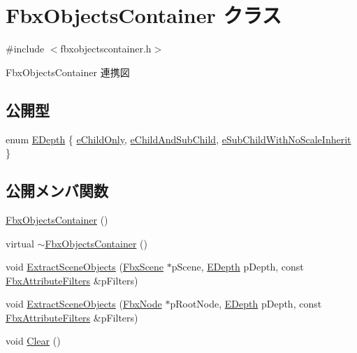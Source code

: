 \hypertarget{class_fbx_objects_container}{}\section{Fbx\+Objects\+Container クラス}
\label{class_fbx_objects_container}


{\ttfamily \#include $<$fbxobjectscontainer.\+h$>$}



Fbx\+Objects\+Container 連携図
\subsection*{公開型}
\begin{DoxyCompactItemize}
\item 
enum \hyperlink{class_fbx_objects_container_a70f47fef529be83cb1b45c0e067d73e5}{E\+Depth} \{ \hyperlink{class_fbx_objects_container_a70f47fef529be83cb1b45c0e067d73e5a8f0f79eb5473a347f5438586ef1d6874}{e\+Child\+Only}, 
\hyperlink{class_fbx_objects_container_a70f47fef529be83cb1b45c0e067d73e5a21904d2f9ea16c484da380962349eb83}{e\+Child\+And\+Sub\+Child}, 
\hyperlink{class_fbx_objects_container_a70f47fef529be83cb1b45c0e067d73e5a14f4e784039822e94a23b24d3f4c9bd5}{e\+Sub\+Child\+With\+No\+Scale\+Inherit}
 \}
\end{DoxyCompactItemize}
\subsection*{公開メンバ関数}
\begin{DoxyCompactItemize}
\item 
\hyperlink{class_fbx_objects_container_a48d3e8b9458cd4ec7ba67c02b537f353}{Fbx\+Objects\+Container} ()
\item 
virtual \hyperlink{class_fbx_objects_container_a1c5d2be12ce25c7f996f16dcc0b98c35}{$\sim$\+Fbx\+Objects\+Container} ()
\item 
void \hyperlink{class_fbx_objects_container_a1d60cd980f37affb7bcb64f9cf53f710}{Extract\+Scene\+Objects} (\hyperlink{class_fbx_scene}{Fbx\+Scene} $\ast$p\+Scene, \hyperlink{class_fbx_objects_container_a70f47fef529be83cb1b45c0e067d73e5}{E\+Depth} p\+Depth, const \hyperlink{fbxobjectscontainer_8h_a74af631b21bcb9d44e73d3293bf785df}{Fbx\+Attribute\+Filters} \&p\+Filters)
\item 
void \hyperlink{class_fbx_objects_container_a7fdcdc24f3c61c3f2001b13f16d7528d}{Extract\+Scene\+Objects} (\hyperlink{class_fbx_node}{Fbx\+Node} $\ast$p\+Root\+Node, \hyperlink{class_fbx_objects_container_a70f47fef529be83cb1b45c0e067d73e5}{E\+Depth} p\+Depth, const \hyperlink{fbxobjectscontainer_8h_a74af631b21bcb9d44e73d3293bf785df}{Fbx\+Attribute\+Filters} \&p\+Filters)
\item 
void \hyperlink{class_fbx_objects_container_aef67efbc03df0eb8c643a680bab44737}{Clear} ()
\end{DoxyCompactItemize}
